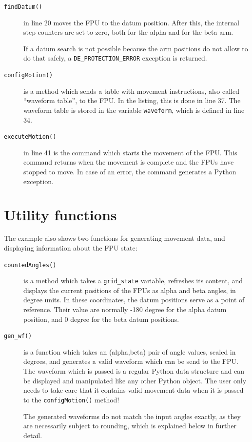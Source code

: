 \documentclass[fontsize=12,a4paper]{scrreprt}
\begin{document}
\begin{description}
\item[\texttt{findDatum()}] in line 20 moves the FPU to the datum
  position. After this, the internal step counters are set to zero,
  both for the alpha and for the beta arm.

  If a datum search is not possible because the arm positions do not
  allow to do that safely, a \texttt{DE\_PROTECTION\_ERROR} exception
  is returned.

\item[\texttt{configMotion()}] is a method which sends a table with
  movement instructions, also called ``waveform table'', to the
  FPU. In the listing, this is done in line 37. The waveform table is
  stored in the variable \texttt{waveform}, which is defined in line
  34.

\item[\texttt{executeMotion()}] in line 41 is the command which starts
  the movement of the FPU. This command returns when the movement is
  complete and the FPUs have stopped to move. In case of an error, the
  command generates a Python exception.

\end{description}

\section{Utility functions}
The example also shows two  functions for generating movement
data, and displaying information about the FPU state:

\begin{description}
\item[\texttt{countedAngles()}] is a method which takes a
  \texttt{grid\_state} variable, refreshes its content, and displays
  the current positions of the FPUs as alpha and beta angles, in
  degree units. In these coordinates, the datum positions serve as a
  point of reference. Their value are normally -180 degree for the
  alpha datum position, and 0 degree for the beta datum positions.

\item[\texttt{gen\_wf()}] is a function which takes an (alpha,beta)
  pair of angle values, scaled in degrees, and generates a valid
  waveform which can be send to the FPU.  The waveform which is passed
  is a regular Python data structure and can be displayed and
  manipulated like any other Python object.  The user only needs to
  take care that it contains valid movement data when it is passed to
  the \texttt{configMotion()} method!

  The generated waveforms do not match the input angles exactly, as
  they are necessarily subject to rounding, which is explained below
  in further detail.

\end{description}
\end{document}
